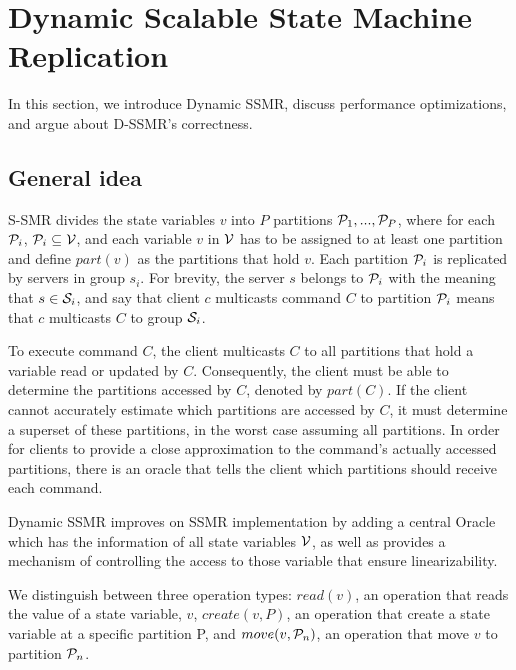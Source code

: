 \section{Dynamic Scalable State Machine Replication}

In this section, we introduce Dynamic SSMR, discuss performance optimizations, and argue about D-SSMR's correctness.

\subsection{General idea}
\label{sec:generalidea}

S-SMR divides the state variables $v$ into $P$ partitions $\mathcal{P}_1, ..., \mathcal{P}_P$, where for each $\mathcal{P}_i$, $\mathcal{P}_i \subseteq \mathcal{V}$, and each variable $v$ in $\mathcal{V}$ has to be assigned to at least one partition and define $part(v)$ as the partitions that hold $v$. Each partition $\mathcal{P}_i$ is replicated by servers in group $s_i$. For brevity, the server $s$ belongs to $\mathcal{P}_i$ with the meaning that $s \in \mathcal{S}_i$, and say that client $c$ multicasts command $C$ to partition $\mathcal{P}_i$ means that $c$ multicasts $C$ to group $\mathcal{S}_i$.

To execute command $C$, the client multicasts $C$ to all partitions that hold a variable read or updated by $C$.
Consequently, the client must be able to determine the partitions accessed by $C$, denoted by $part(C)$. If the client cannot accurately estimate which partitions are accessed by $C$, it must determine a superset of these partitions, in the worst case assuming all partitions.
In order for clients to provide a close approximation to the command's actually accessed partitions, there is an oracle that tells the client which partitions should receive each command.

Dynamic SSMR improves on SSMR implementation by adding a central Oracle which has the information of all state variables $\mathcal{V}$, as well as provides a mechanism of controlling the access to those variable that ensure linearizability. 

We distinguish between three operation types: $read(v)$, an operation that reads the value of a state variable, $v$, $create(v, P)$, an operation that create a state variable at a specific partition P, and $move(v, \mathcal{P}_n)$, an operation that move $v$ to partition $\mathcal{P}_n$.

